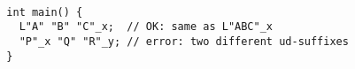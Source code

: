 \paragraph{} %
\begin{example} %
  \begin{lstlisting}
  int main() {
    L"A" "B" "C"_x;  // OK: same as L"ABC"_x
    "P"_x "Q" "R"_y; // error: two different ud-suffixes
  }
  \end{lstlisting}
\end{example}
